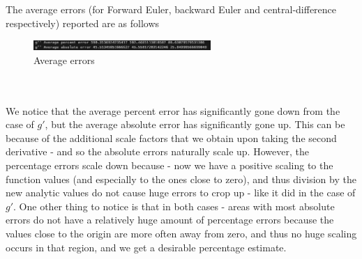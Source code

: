 \documentclass[12pt]{article}
\begin{document}
The average errors (for Forward Euler, backward Euler and central-difference respectively) reported are as follows 
\begin{figure}[h]
	\centering
	\includegraphics[width=0.60\textwidth]{error200gdpr.png}
	\caption{Average errors}
\end{figure}\\\\
We notice that the average percent error has significantly gone down from the case of $g'$, but the average absolute error has significantly gone up. This can be because of the additional scale factors that we obtain upon taking the second derivative - and so the absolute errors naturally scale up. However, the percentage errors scale down because - now we have a positive scaling to the function values (and especially to the ones close to zero), and thus division by the new analytic values do not cause huge errors to crop up - like it did in the case of $g'$. One other thing to notice is that in both cases - areas with most absolute errors do not have a relatively huge amount of percentage errors because the values close to the origin are more often away from zero, and thus no huge scaling occurs in that region, and we get a desirable percentage estimate. \\\\
\end{document}
